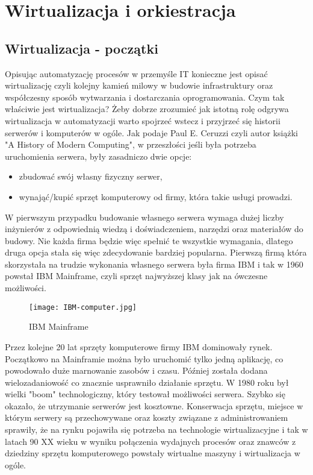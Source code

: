 \section{Wirtualizacja i orkiestracja}

\subsection{Wirtualizacja - początki}
Opisując automatyzację procesów w przemyśle IT konieczne jest opisać wirtualizację czyli kolejny kamień milowy w budowie infrastruktury oraz współczesny sposób wytwarzania i dostarczania oprogramowania. Czym tak właściwie jest wirtualizacja? 
Żeby dobrze zrozumieć jak istotną rolę odgrywa wirtualizacja w automatyzacji warto spojrzeć wstecz i przyjrzeć się historii serwerów i komputerów w ogóle.   Jak podaje Paul E. Ceruzzi czyli autor książki "A History of Modern Computing"\cite{Computing}, w przeszłości jeśli była potrzeba uruchomienia serwera, były zasadniczo dwie opcje: 
\begin{itemize}
    \item zbudować swój własny fizyczny serwer,
    \item wynająć/kupić sprzęt komputerowy od firmy, która takie usługi prowadzi.
\end{itemize}
W pierwszym przypadku budowanie własnego serwera wymaga dużej liczby inżynierów z odpowiednią wiedzą i doświadczeniem, narzędzi oraz materiałów do budowy. Nie każda firma będzie więc spełnić te wszystkie wymagania, dlatego druga opcja stała się więc zdecydowanie bardziej popularna. Pierwszą firmą która skorzystała na trudzie wykonania własnego serwera była firma IBM i tak w 1960 powstał IBM Mainframe, czyli sprzęt najwyższej klasy jak na  ówczesne możliwości.

\begin{figure}[htbp]
    \centering
    \texttt{[image: IBM-computer.jpg]}
    \caption{IBM Mainframe}
    \label{fig:ibm-mainframe}
\end{figure}

Przez kolejne 20 lat sprzęty komputerowe firmy IBM dominowały rynek. Początkowo na Mainframie można było uruchomić tylko jedną aplikację, co powodowało duże marnowanie zasobów i czasu. Później została dodana wielozadaniowość co znacznie usprawniło działanie sprzętu. W 1980 roku był wielki "boom" technologiczny, który testował możliwości serwera. Szybko się okazało, że utrzymanie serwerów jest kosztowne. Konserwacja sprzętu, miejsce w którym serwery są przechowywane oraz koszty związane z administrowaniem sprawiły, że na rynku pojawiła się potrzeba na technologie wirtualizacyjne i tak w latach 90 XX wieku w wyniku połączenia wydajnych procesów oraz znawców z dziedziny sprzętu komputerowego powstały wirtualne maszyny i wirtualizacja w ogóle. 

